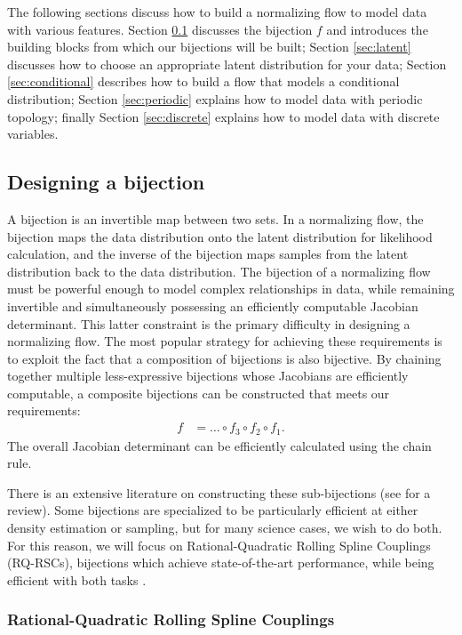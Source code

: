 \documentclass[twocolumn,twocolappendix,linenumbers]{aastex631}
\begin{document}
The following sections discuss how to build a normalizing flow to model data with various features.
Section \ref{sec:bijections} discusses the bijection $f$ and introduces the building blocks from which our bijections will be built;
Section \ref{sec:latent} discusses how to choose an appropriate latent distribution for your data;
Section \ref{sec:conditional} describes how to build a flow that models a conditional distribution;
Section \ref{sec:periodic} explains how to model data with periodic topology;
finally Section \ref{sec:discrete} explains how to model data with discrete variables.


\subsection{Designing a bijection}
\label{sec:bijections}

A bijection is an invertible map between two sets.
In a normalizing flow, the bijection maps the data distribution onto the latent distribution for likelihood calculation, and the inverse of the bijection maps samples from the latent distribution back to the data distribution.
The bijection of a normalizing flow must be powerful enough to model complex relationships in data, while remaining invertible and simultaneously possessing an efficiently computable Jacobian determinant.
This latter constraint is the primary difficulty in designing a normalizing flow.
The most popular strategy for achieving these requirements is to exploit the fact that a composition of bijections is also bijective.
By chaining together multiple less-expressive bijections whose Jacobians are efficiently computable, a composite bijections can be constructed that meets our requirements:
\begin{align}
    f &= \dots \circ f_3 \circ f_2 \circ f_1.
\end{align}
The overall Jacobian determinant can be efficiently calculated using the chain rule.

There is an extensive literature on constructing these sub-bijections (see \citealt{kobyzev2020} for a review).
Some bijections are specialized to be particularly efficient at either density estimation or sampling, but for many science cases, we wish to do both.
For this reason, we will focus on Rational-Quadratic Rolling Spline Couplings (RQ-RSCs), bijections which achieve state-of-the-art performance, while being efficient with both tasks \citep{durkan2019}.

\subsubsection{Rational-Quadratic Rolling Spline Couplings}
\label{sec:rq-rsc}
\end{document}
